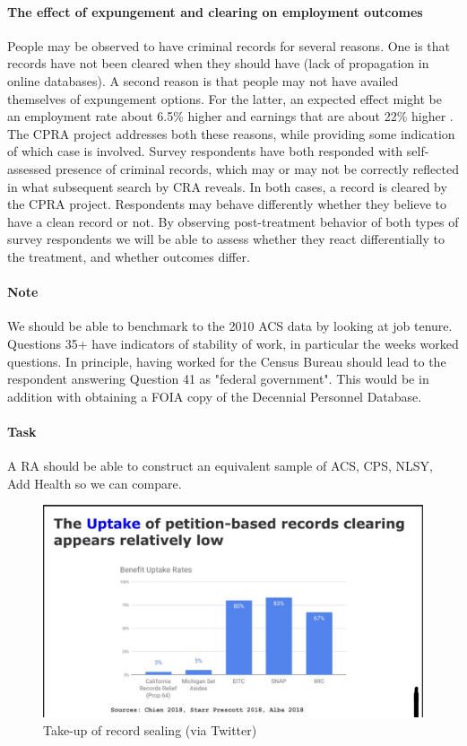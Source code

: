 \documentclass[letterpaper,man,biblatex]{apa6}
\begin{document}
\paragraph{The effect of expungement and clearing on employment outcomes} People may be observed to have criminal records for several reasons. One is that records have not been cleared when they should have (lack of propagation in online databases). A second reason is that people may not have availed themselves of expungement options. For the latter, an expected effect might be an employment rate about 6.5\% higher and earnings that are about 22\% higher \parencite{starr_michigan_2018}. The CPRA project addresses both these reasons, while providing some indication of which case is involved. Survey respondents have both responded with self-assessed presence of criminal records, which may or may not be correctly reflected in what subsequent search by \ac{CRA} reveals. In both cases, a record is cleared by the CPRA project. Respondents may behave differently whether they believe to have a clean record or not. By observing post-treatment behavior of both types of survey respondents we will be able to assess whether they react differentially to the treatment, and whether outcomes differ. 

\paragraph{Note} We should be able to benchmark to the 2010 \ac{ACS} data by looking at job tenure. Questions 35+ \parencite{u.s._census_bureau_2010_2010} have indicators of stability of work, in particular the weeks worked questions. In principle, having worked for the Census Bureau should lead to the respondent answering Question 41 as "federal government". This would be in addition with obtaining a FOIA copy of the Decennial Personnel Database. 

\paragraph{Task} A RA should be able to construct an equivalent sample of ACS, CPS, NLSY, Add Health so we can compare.

%
\printbibliography[title={References}]

\appendix
\begin{figure}
    \centering
    \includegraphics[width=\textwidth]{images/chien-via-twitter.jpeg}
    \caption{Take-up of record sealing (via Twitter)}
    \label{fig:chien-via-twitter}
\end{figure}
\end{document}
